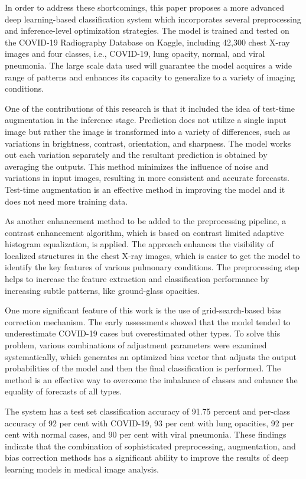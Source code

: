 \documentclass[a4paper,fleqn]{cas-dc}
\begin{document}
In order to address these shortcomings, this paper proposes a more advanced deep learning-based classification system which incorporates several preprocessing and inference-level optimization strategies. The model is trained and tested on the COVID-19 Radiography Database on Kaggle, including 42,300 chest X-ray images and four classes, i.e., COVID-19, lung opacity, normal, and viral pneumonia. The large scale data used will guarantee the model acquires a wide range of patterns and enhances its capacity to generalize to a variety of imaging conditions.

One of the contributions of this research is that it included the idea of test-time augmentation in the inference stage. Prediction does not utilize a single input image but rather the image is transformed into a variety of differences, such as variations in brightness, contrast, orientation, and sharpness. The model works out each variation separately and the resultant prediction is obtained by averaging the outputs. This method minimizes the influence of noise and variations in input images, resulting in more consistent and accurate forecasts. Test-time augmentation is an effective method in improving the model and it does not need more training data.

As another enhancement method to be added to the preprocessing pipeline, a contrast enhancement algorithm, which is based on contrast limited adaptive histogram equalization, is applied. The approach enhances the visibility of localized structures in the chest X-ray images, which is easier to get the model to identify the key features of various pulmonary conditions. The preprocessing step helps to increase the feature extraction and classification performance by increasing subtle patterns, like ground-glass opacities.

One more significant feature of this work is the use of grid-search-based bias correction mechanism. The early assessments showed that the model tended to underestimate COVID-19 cases but overestimated other types. To solve this problem, various combinations of adjustment parameters were examined systematically, which generates an optimized bias vector that adjusts the output probabilities of the model and then the final classification is performed. The method is an effective way to overcome the imbalance of classes and enhance the equality of forecasts of all types.

The system has a test set classification accuracy of 91.75 percent and per-class accuracy of 92 per cent with COVID-19, 93 per cent with lung opacities, 92 per cent with normal cases, and 90 per cent with viral pneumonia. These findings indicate that the combination of sophisticated preprocessing, augmentation, and bias correction methods has a significant ability to improve the results of deep learning models in medical image analysis.
\end{document}
